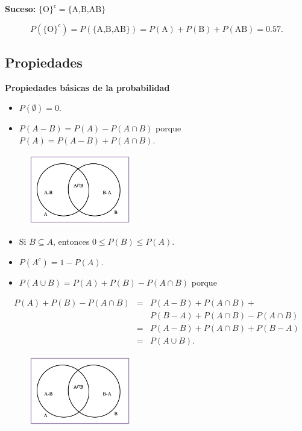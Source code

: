 \documentclass[
  letterpaper,
  DIV=11,
  numbers=noendperiod]{scrreprt}
\begin{document}
\textbf{Suceso:} \(\{\mbox{O}\}^c=\{\mbox{A,B,AB}\}\)

\[P(\{\mbox{O}\}^c)\!=\!P(\{\mbox{A,B,AB}\})\!=\!
P(\mbox{A})+P (\mbox{B})+P(\mbox{AB})\!=\!0.57.\]

\hypertarget{propiedades-1}{%
\subsection{Propiedades}\label{propiedades-1}}

\textbf{Propiedades básicas de la probabilidad}

\begin{itemize}
\item
  \(P(\emptyset)=0\).
\item
  \(P(A-B)=P(A)-P(A\cap B)\) porque \(P(A)=P(A-B)+P(A\cap B)\).
\end{itemize}

\begin{figure}

{\centering \includegraphics[width=0.4\textwidth,height=\textheight]{Images/proba1dibujos/A-B.jpg}

}

\end{figure}

\begin{itemize}
\item
  Si \(B\subseteq A\), entonces \(0\leq P(B)\leq P(A)\).
\item
  \(P(A^c)=1-P(A)\).
\item
  \(P(A\cup B)=P(A)+P(B)-P(A\cap B)\) porque
\end{itemize}

\begin{eqnarray*}
P(A)+P(B)-P(A\cap B) &=& P(A-B)+P(A\cap B)+\\
 & & P(B-A)+ P(A\cap  B)-P(A\cap  B)\\
&=& P(A-B)+P(A\cap B)+ P(B-A) \\
&=& P(A\cup B).
\end{eqnarray*}

\begin{figure}

{\centering \includegraphics[width=0.4\textwidth,height=\textheight]{Images/proba1dibujos/A-B.jpg}

}

\end{figure}
\end{document}
